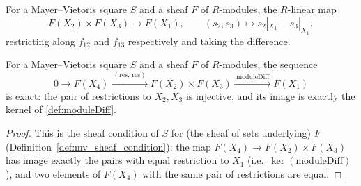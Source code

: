 \begin{definition}
  \label{def:moduleDiff}
  \leanok
  For a Mayer--Vietoris square \(S\) and a sheaf \(F\) of \(R\)-modules, the \(R\)-linear map
  \[
    F(X_2) \times F(X_3) \longrightarrow F(X_1), \qquad
    (s_2, s_3) \longmapsto s_2|_{X_1} - s_3|_{X_1},
  \]
  restricting along \(f_{12}\) and \(f_{13}\) respectively and taking the difference.
\end{definition}

\begin{lemma}
  \label{lem:mv_exact_degree0}
  \leanok
  For a Mayer--Vietoris square \(S\) and a sheaf \(F\) of \(R\)-modules, the sequence
  \[
    0 \to F(X_4) \xrightarrow{\ (\mathrm{res},\,\mathrm{res})\ } F(X_2) \times F(X_3)
      \xrightarrow{\ \mathrm{moduleDiff}\ } F(X_1)
  \]
  is exact: the pair of restrictions to \(X_2, X_3\) is injective, and its image is exactly
  the kernel of \ref{def:moduleDiff}.
\end{lemma}
\begin{proof}
  \leanok
  This is the sheaf condition of \(S\) for (the sheaf of sets underlying) \(F\)
  (Definition~\ref{def:mv_sheaf_condition}): the map \(F(X_4) \to F(X_2) \times F(X_3)\) has
  image exactly the pairs with equal restriction to \(X_1\) (i.e.\
  \(\ker(\mathrm{moduleDiff})\)), and two elements of \(F(X_4)\) with the same pair of
  restrictions are equal.
\end{proof}

